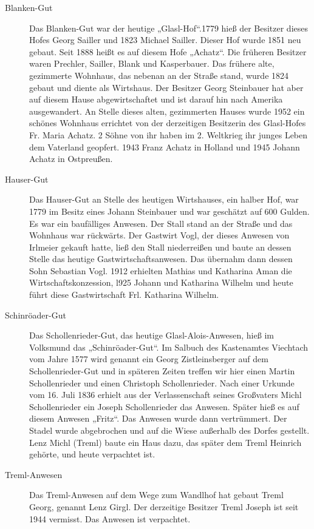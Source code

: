\documentclass[12pt,a4pager,draft]{book}
\begin{document}
\begin{description}
\item[Blanken-Gut] Das Blanken-Gut war der heutige „Glasl-Hof“.1779 hieß der
Besitzer dieses Hofes Georg Sailler und 1823 Michael Sailler. Dieser Hof wurde
1851 neu gebaut. Seit 1888 heißt es auf diesem Hofe „Achatz“. Die früheren
Besitzer waren Prechler, Sailler, Blank und Kasperbauer. Das frühere alte,
gezimmerte Wohnhaus, das nebenan an der Straße stand, wurde 1824 gebaut und
diente als Wirtshaus. Der Besitzer Georg Steinbauer hat aber auf diesem Hause
abgewirtschaftet und ist darauf hin nach Amerika ausgewandert. An Stelle dieses
alten, gezimmerten Hauses wurde 1952 ein schönes Wohnhaus errichtet von der
derzeitigen Besitzerin des Glasl-Hofes Fr. Maria Achatz. 2 Söhne von ihr haben
im 2. Weltkrieg ihr junges Leben dem Vaterland geopfert. 1943 Franz Achatz in
Holland und 1945 Johann Achatz in Ostpreußen.

\item[Hauser-Gut] Das Hauser-Gut an Stelle des heutigen Wirtshauses, ein halber
Hof, war 1779 im Besitz eines Johann Steinbauer und war geschätzt auf 600
Gulden. Es war ein baufälliges Anwesen. Der Stall stand an der Straße und das
Wohnhaus war rückwärts. Der Gastwirt Vogl, der dieses Anwesen von Irlmeier
gekauft hatte, ließ den Stall niederreißen und baute an dessen Stelle das
heutige Gastwirtschaftsanwesen. Das übernahm dann dessen Sohn Sebastian Vogl.
1912 erhielten Mathias und Katharina Aman die Wirtschaftskonzession, l925 Johann
und Katharina Wilhelm und heute führt diese Gastwirtschaft Frl. Katharina
Wilhelm.

\item[Schinröader-Gut] Das Schollenrieder-Gut, das heutige Glasl-Alois-Anwesen,
hieß im Volksmund das „Schinröader-Gut“. Im Salbuch des Kastenamtes Viechtach
vom Jahre 1577 wird genannt ein Georg Zistleinsberger auf dem Schollenrieder-Gut
und in späteren Zeiten treffen wir hier einen Martin Schollenrieder und einen
Christoph Schollenrieder. Nach einer Urkunde vom 16. Juli 1836 erhielt aus der
Verlassenschaft seines Großvaters Michl Schollenrieder ein Joseph Schollenrieder
das Anwesen. Später hieß es auf diesem Anwesen „Fritz“. Das Anwesen wurde dann
vertrümmert. Der Stadel wurde abgebrochen und auf die Wiese außerhalb des Dorfes
gestellt. Lenz Michl (Treml) baute ein Haus dazu, das später dem Treml Heinrich
gehörte, und heute verpachtet ist.

\item[Treml-Anwesen] Das Treml-Anwesen auf dem Wege zum Wandlhof hat gebaut
Treml Georg, genannt Lenz Girgl. Der derzeitige Besitzer Treml Joseph ist seit
1944 vermisst. Das Anwesen ist verpachtet.


\end{description}
\end{document}
